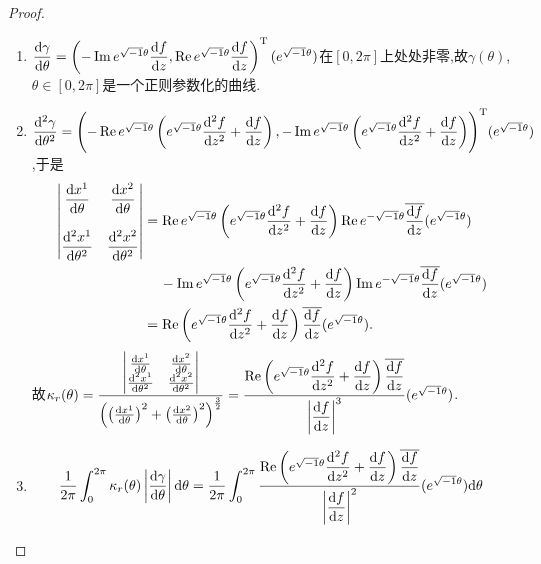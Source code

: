 	\begin{proof}
		\begin{enumerate}[label=(\roman*)]
			\item $\dfrac{\mathrm{d} \gamma}{\mathrm{d} \theta}=\left(-\operatorname{Im} e^{\sqrt{-1}\theta}\dfrac{\mathrm{d} f}{\mathrm{d} z},\operatorname{Re} e^{\sqrt{-1}\theta}\dfrac{\mathrm{d} f}{\mathrm{d} z}\right)^{\mathrm{T}}(e^{\sqrt{-1}\theta})$在$[0,2\pi]$上处处非零,故$\gamma(\theta)$, $\theta\in[0,2\pi]$是一个正则参数化的曲线.
			\item $\dfrac{\mathrm{d}^{2} \gamma}{\mathrm{d} \theta^{2}}=\Biggl(-\operatorname{Re} e^{\sqrt{-1}\theta}\left(e^{\sqrt{-1}\theta}\dfrac{\mathrm{d}^{2} f}{\mathrm{d} z^{2}}+\dfrac{\mathrm{d} f}{\mathrm{d} z}\right),-\operatorname{Im} e^{\sqrt{-1}\theta}\left(e^{\sqrt{-1}\theta}\dfrac{\mathrm{d}^{2} f}{\mathrm{d} z^{2}}+\dfrac{\mathrm{d} f}{\mathrm{d} z}\right)\Biggr)^{\mathrm{T}}(e^{\sqrt{-1}\theta})$,于是
			\begin{align*}
				\begin{vmatrix}
					\dfrac{\mathrm{d} x^{1}}{\mathrm{d} \theta}&\dfrac{\mathrm{d} x^{2}}{\mathrm{d} \theta}\\ \\
					\dfrac{\mathrm{d}^{2} x^{1}}{\mathrm{d} \theta^{2}}&\dfrac{\mathrm{d}^{2} x^{2}}{\mathrm{d} \theta^{2}}
				\end{vmatrix}&=\operatorname{Re} e^{\sqrt{-1}\theta}\left(e^{\sqrt{-1}\theta}\dfrac{\mathrm{d}^{2} f}{\mathrm{d} z^{2}}+\dfrac{\mathrm{d} f}{\mathrm{d} z}\right)\operatorname{Re} e^{-\sqrt{-1}\theta}\overline{\dfrac{\mathrm{d} f}{\mathrm{d} z}}(e^{\sqrt{-1}\theta})\\
				&\quad\,-\operatorname{Im} e^{\sqrt{-1}\theta}\left(e^{\sqrt{-1}\theta}\frac{\mathrm{d}^{2} f}{\mathrm{d} z^{2}}+\frac{\mathrm{d} f}{\mathrm{d} z}\right)\operatorname{Im} e^{-\sqrt{-1}\theta}\overline{\frac{\mathrm{d} f}{\mathrm{d} z}}(e^{\sqrt{-1}\theta})\\
				&=\operatorname{Re}\left(e^{\sqrt{-1}\theta}\frac{\mathrm{d}^{2}f}{\mathrm{d} z^{2}}+\frac{\mathrm{d} f}{\mathrm{d} z}\right)\overline{\frac{\mathrm{d} f}{\mathrm{d} z}}(e^{\sqrt{-1}\theta}).
 			\end{align*}
			故$\kappa_{r}(\theta)=\dfrac{
			\begin{vmatrix}
				\frac{\mathrm{d} x^{1}}{\mathrm{d} \theta}&\frac{\mathrm{d} x^{2}}{\mathrm{d} \theta}\\
				\frac{\mathrm{d}^{2} x^{1}}{\mathrm{d} \theta^{2}}&\frac{\mathrm{d}^{2} x^{2}}{\mathrm{d} \theta^{2}}
			\end{vmatrix}}{\left(\left(\frac{\mathrm{d} x^{1}}{\mathrm{d} \theta}\right)^{2}+\left(\frac{\mathrm{d} x^{2}}{\mathrm{d} \theta}\right)^{2}\right)^{\frac{3}{2}}}=\dfrac{\operatorname{Re}\left(e^{\sqrt{-1}\theta}\dfrac{\mathrm{d}^{2}f}{\mathrm{d} z^{2}}+\dfrac{\mathrm{d} f}{\mathrm{d} z}\right)\overline{\dfrac{\mathrm{d} f}{\mathrm{d} z}}}{\left|\dfrac{\mathrm{d} f}{\mathrm{d} z}\right|^{3}}(e^{\sqrt{-1}\theta})$.
			\item 
			\begin{align*}
				\frac{1}{2\pi}\int_{0}^{2\pi}\kappa_{r}(\theta)\left|\frac{\d\gamma}{\d\theta}\right|\d\theta&=\frac{1}{2\pi}\int_{0}^{2\pi}\frac{\Re\left(e^{\sqrt{-1}\theta}\dfrac{\d^{2}f}{\d z^{2}}+\dfrac{\d f}{\d z}\right)\overline{\dfrac{\d f}{\d z}}}{\left|\dfrac{\d f}{\d z}\right|^{2}}(e^{\sqrt{-1}\theta})\d\theta\\

\end{align*}
\end{enumerate}
\end{proof}
